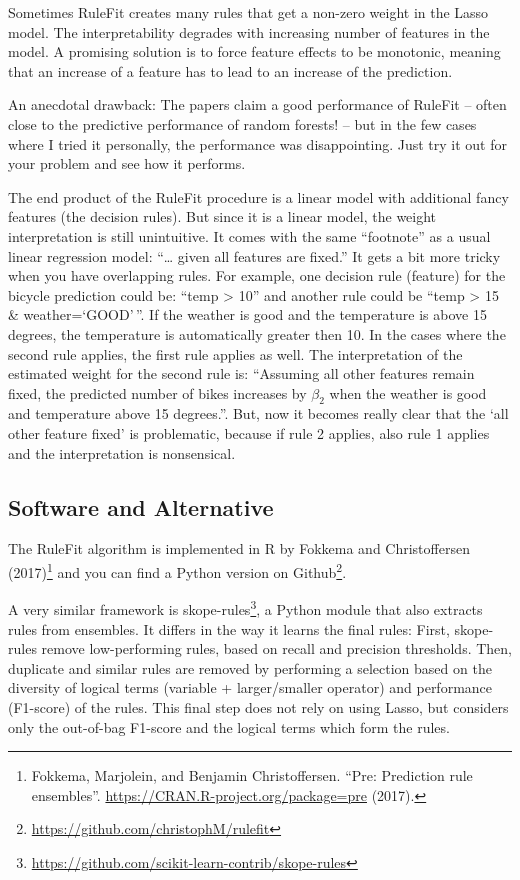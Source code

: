 \documentclass[
  12pt,
]{krantz}
\renewcommand{\href}[2]{#2\footnote{\url{#1}}}
\begin{document}
Sometimes RuleFit creates many rules that get a non-zero weight in the Lasso model.
The interpretability degrades with increasing number of features in the model.
A promising solution is to force feature effects to be monotonic, meaning that an increase of a feature has to lead to an increase of the prediction.

An anecdotal drawback: The papers claim a good performance of RuleFit -- often close to the predictive performance of random forests! -- but in the few cases where I tried it personally, the performance was disappointing.
Just try it out for your problem and see how it performs.

The end product of the RuleFit procedure is a linear model with additional fancy features (the decision rules).
But since it is a linear model, the weight interpretation is still unintuitive.
It comes with the same ``footnote'' as a usual linear regression model:
``\ldots{} given all features are fixed.''
It gets a bit more tricky when you have overlapping rules.
For example, one decision rule (feature) for the bicycle prediction could be: ``temp \textgreater{} 10'' and another rule could be ``temp \textgreater{} 15 \& weather=`GOOD'\,''.
If the weather is good and the temperature is above 15 degrees, the temperature is automatically greater then 10.
In the cases where the second rule applies, the first rule applies as well.
The interpretation of the estimated weight for the second rule is:
``Assuming all other features remain fixed, the predicted number of bikes increases by \(\beta_2\) when the weather is good and temperature above 15 degrees.''.
But, now it becomes really clear that the `all other feature fixed' is problematic, because if rule 2 applies, also rule 1 applies and the interpretation is nonsensical.

\hypertarget{software-and-alternative}{%
\subsection{Software and Alternative}\label{software-and-alternative}}

The RuleFit algorithm is implemented in R by Fokkema and Christoffersen (2017)\footnote{Fokkema, Marjolein, and Benjamin Christoffersen. ``Pre: Prediction rule ensembles''. \url{https://CRAN.R-project.org/package=pre} (2017).} and you can find a \href{https://github.com/christophM/rulefit}{Python version on Github}.

A very similar framework is \href{https://github.com/scikit-learn-contrib/skope-rules}{skope-rules}, a Python module that also extracts rules from ensembles.
It differs in the way it learns the final rules:
First, skope-rules remove low-performing rules, based on recall and precision thresholds.
Then, duplicate and similar rules are removed by performing a selection based on the diversity of logical terms (variable + larger/smaller operator) and performance (F1-score) of the rules.
This final step does not rely on using Lasso, but considers only the out-of-bag F1-score and the logical terms which form the rules.
\end{document}
